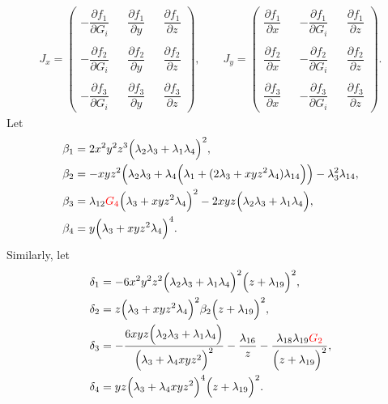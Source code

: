 \documentclass{svjour3}
\begin{document}
{\footnotesize
\begin{align*}
J_x=\begin{pmatrix}
-\dfrac{\partial f_1}{\partial G_i} && \dfrac{\partial f_1}{\partial y} && \dfrac{\partial f_1}{\partial z} \\
\\
-\dfrac{\partial f_2}{\partial G_i} && \dfrac{\partial f_2}{\partial y} && \dfrac{\partial f_2}{\partial z} \\
\\
-\dfrac{\partial f_3}{\partial G_i} && \dfrac{\partial f_3}{\partial y} && \dfrac{\partial f_3}{\partial z}
\end{pmatrix},
\qquad
J_y=
\begin{pmatrix}
\dfrac{\partial f_1}{\partial x} && -\dfrac{\partial f_1}{\partial G_i} && \dfrac{\partial f_1}{\partial z} \\
\\
\dfrac{\partial f_2}{\partial x} && -\dfrac{\partial f_2}{\partial G_i} && \dfrac{\partial f_2}{\partial z} \\
\\
\dfrac{\partial f_3}{\partial x} && -\dfrac{\partial f_3}{\partial G_i} && \dfrac{\partial f_3}{\partial z}
\end{pmatrix}.
\end{align*}
}
Let
{\footnotesize
\begin{align*}
& \beta_1=2 x^2 y^2 z^3 \Big( \lambda_2 \lambda_3 + \lambda_1 \lambda_4 \Big)^2, \\
& \beta_2= - xyz^2 \Big(\lambda_2 \lambda_3 + \lambda_4 \Big(\lambda_1+ (2 \lambda_3 + xy z^2  \lambda_4) \lambda_{14} \Big) \Big)- \lambda_3^2 \lambda_{14}, \\
& \beta_3=\lambda_{12} {\color{red}G_{4}} \Big(\lambda_{3}+xyz^2 \lambda_4 \Big)^2 - 2 xyz  \Big( \lambda_2 \lambda_3 + \lambda_1 \lambda_4\Big),\\
&\beta_4=y\Big( \lambda_3 + xyz^2  \lambda_4\Big)^4.
\end{align*}
}
Similarly, let 
{\footnotesize
\begin{align*}
&\delta_1=-6 x^2 y^2 z^2  \Big( \lambda_2 \lambda_3 + \lambda_1 \lambda_4 \Big)^2 \Big(z+\lambda_{19} \Big)^2,\\
& \delta_2= z \Big(\lambda_3+xyz^2\lambda_4 \Big)^2 \beta_2\Big(z+\lambda_{19} \Big)^2,\\
&\delta_3= -\dfrac{6 x y z  \Big( \lambda_2 \lambda_3 + \lambda_1 \lambda_4 \Big)}{\Big( \lambda_3+ \lambda_4 x y z^2  \Big)^2}-\dfrac{\lambda_{16}}{z} - \frac{\lambda_{18} \lambda_{19} {\color{red}G_{2}}}{\Big( z+ \lambda_{19}\Big)^2},\\
& \delta_4=yz \Big( \lambda_3+ \lambda_4 x y z^2 \Big)^4 \Big(z+\lambda_{19} \Big)^2.
\end{align*}
}
\end{document}
